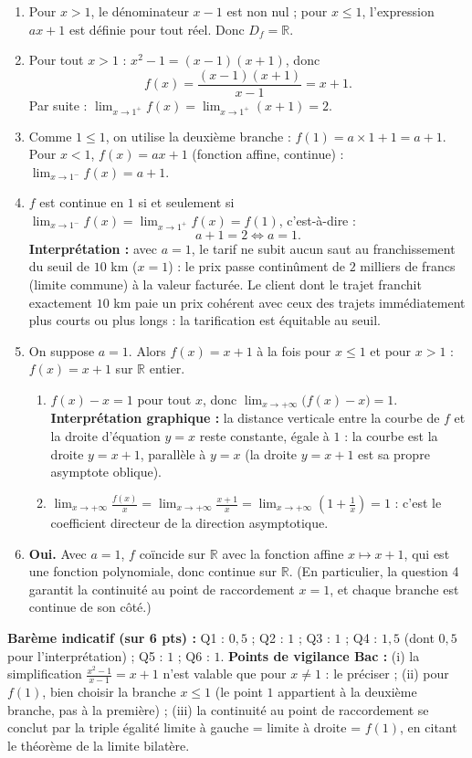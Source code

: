 \documentclass[11pt]{article}
\begin{document}
\begin{corrige}
\begin{enumerate}
\item Pour $x>1$, le dénominateur $x-1$ est non nul ; pour $x\leq 1$, l'expression $ax+1$ est définie pour tout réel. Donc $D_f=\boxed{\mathbb{R}}$.
\item Pour tout $x>1$ : $x^2-1=(x-1)(x+1)$, donc
\[ f(x)=\frac{(x-1)(x+1)}{x-1}=x+1. \]
Par suite : $\displaystyle\lim_{x\to 1^+}f(x)=\lim_{x\to 1^+}(x+1)=\boxed{2}$.
\item Comme $1\leq 1$, on utilise la deuxième branche : $f(1)=a\times 1+1=\boxed{a+1}$.
Pour $x<1$, $f(x)=ax+1$ (fonction affine, continue) : $\displaystyle\lim_{x\to 1^-}f(x)=\boxed{a+1}$.
\item $f$ est continue en $1$ si et seulement si $\lim_{x\to 1^-}f(x)=\lim_{x\to 1^+}f(x)=f(1)$, c'est-à-dire :
\[ a+1=2\iff \boxed{a=1}. \]
\textbf{Interprétation :} avec $a=1$, le tarif ne subit aucun saut au franchissement du seuil de $10$ km ($x=1$) : le prix passe continûment de $2$ milliers de francs (limite commune) à la valeur facturée. Le client dont le trajet franchit exactement $10$ km paie un prix cohérent avec ceux des trajets immédiatement plus courts ou plus longs : la tarification est équitable au seuil.
\item On suppose $a=1$. Alors $f(x)=x+1$ à la fois pour $x\leq 1$ et pour $x>1$ : $f(x)=x+1$ sur $\mathbb{R}$ entier.
\begin{enumerate}
\item $f(x)-x=1$ pour tout $x$, donc $\displaystyle\lim_{x\to +\infty}\big(f(x)-x\big)=\boxed{1}$.
\textbf{Interprétation graphique :} la distance verticale entre la courbe de $f$ et la droite d'équation $y=x$ reste constante, égale à $1$ : la courbe est la droite $y=x+1$, parallèle à $y=x$ (la droite $y=x+1$ est sa propre asymptote oblique).
\item $\displaystyle\lim_{x\to +\infty}\frac{f(x)}{x}=\lim_{x\to +\infty}\frac{x+1}{x}=\lim_{x\to +\infty}\left(1+\frac{1}{x}\right)=\boxed{1}$ : c'est le coefficient directeur de la direction asymptotique.
\end{enumerate}
\item \textbf{Oui.} Avec $a=1$, $f$ coïncide sur $\mathbb{R}$ avec la fonction affine $x\mapsto x+1$, qui est une fonction polynomiale, donc continue sur $\mathbb{R}$. (En particulier, la question 4 garantit la continuité au point de raccordement $x=1$, et chaque branche est continue de son côté.)
\end{enumerate}
\textbf{Barème indicatif (sur 6 pts) :} Q1 : $0,5$ ; Q2 : $1$ ; Q3 : $1$ ; Q4 : $1,5$ (dont $0,5$ pour l'interprétation) ; Q5 : $1$ ; Q6 : $1$.
\textbf{Points de vigilance Bac :} (i) la simplification $\frac{x^2-1}{x-1}=x+1$ n'est valable que pour $x\neq 1$ : le préciser ; (ii) pour $f(1)$, bien choisir la branche $x\leq 1$ (le point $1$ appartient à la deuxième branche, pas à la première) ; (iii) la continuité au point de raccordement se conclut par la triple égalité limite à gauche = limite à droite = $f(1)$, en citant le théorème de la limite bilatère.
\end{corrige}
\end{document}
